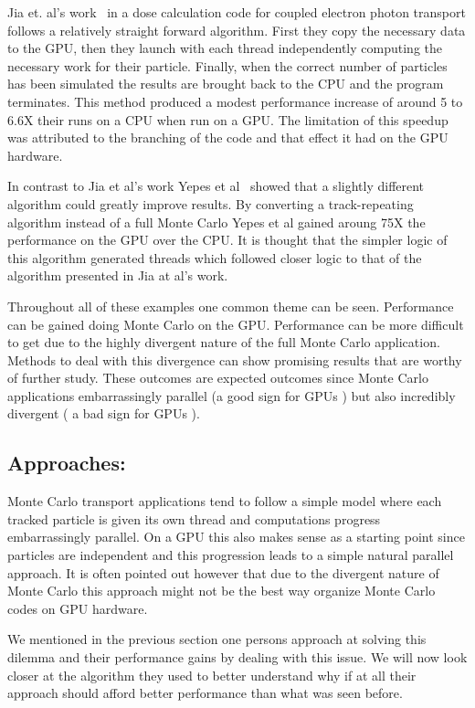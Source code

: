 Jia et. al's  work~\cite{jia2010development} in a dose calculation code for coupled electron photon transport follows a relatively straight forward algorithm.
%
First they copy the necessary data to the GPU, then they launch with each thread independently computing the necessary work for their particle.
%
Finally, when the correct number of particles has been simulated the results are brought back to the CPU and the program terminates.
%
This method produced a modest performance increase of around 5 to 6.6X their runs on a CPU when run on a GPU.
%
The limitation of this speedup was attributed to the branching of the code and that effect it had on the GPU hardware.

In contrast to Jia et al's work Yepes et al~\cite{yepes2010gpu} showed that a slightly different algorithm could greatly improve results.
%
By converting a track-repeating algorithm instead of a full Monte Carlo Yepes et al gained aroung 75X the performance on the GPU over the CPU.
%
It is thought that the simpler logic of this algorithm generated threads which followed closer logic to that of the algorithm presented in Jia at al's work.

Throughout all of these examples one common theme can be seen.
%
Performance can be gained doing Monte Carlo on the GPU.
%
Performance can be more difficult to get due to the highly divergent nature of the full Monte Carlo application.
%
Methods to deal with this divergence can show promising results that are worthy of further study.
%
These outcomes are expected outcomes since Monte Carlo applications embarrassingly parallel (a good sign for GPUs ) but also incredibly divergent ( a bad sign for GPUs ).

\subsection*{Approaches: }

Monte Carlo transport applications tend to follow a simple model where each tracked particle is given its own thread and computations progress embarrassingly parallel. 
%
On a GPU this also makes sense as a starting point since particles are independent and this progression leads to a simple natural parallel approach.
%
It is often pointed out however that due to the divergent nature of Monte Carlo this approach might not be the best way organize Monte Carlo codes on GPU hardware.
%

We mentioned in the previous section one persons approach at solving this dilemma and their performance gains by dealing with this issue.
%
We will now look closer at the algorithm they used to better understand why if at all their approach should afford better performance than what was seen before.
%

